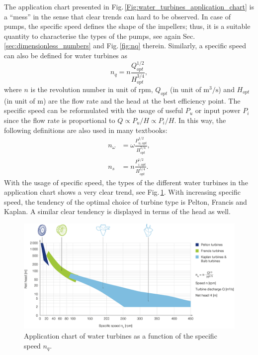 The application chart presented in Fig.\,\ref{Fig:water_turbines_application_chart} is a ``mess'' in the sense that clear trends can hard to be observed. In case of pumps, the specific speed defines the shape of the impellers; thus, it is a suitable quantity to characterise the types of the pumps, see again Sec.\,\ref{sec:dimensionless_numbers} and Fig.\,\ref{fig:nq} therein. Similarly, a specific speed can also be defined for water turbines as
%
\begin{equation}
n_q = n \frac{Q_{opt}^{1/2}}{H_{opt}^{3/4}},
\end{equation}
%
where $n$ is the revolution number in unit of $\mathrm{rpm}$, $Q_{opt}$ (in unit of $\mathrm{m^3/s}$) and $H_{opt}$ (in unit of $\mathrm{m}$) are the flow rate and the head at the best efficiency point. The specific speed can be reformulated with the usage of useful $P_u$ or input power $P_i$ since the flow rate is proportional to $Q \propto P_u/H \propto P_i/H$. In this way, the following definitions are also used in many textbooks:
%
\begin{align}
n_{\omega} &= \omega \frac{P_{u,opt}^{1/2}}{H_{opt}^{5/4}}, \\
n_s        &= n \frac{P_{i,opt}^{1/2}}{H_{opt}^{5/4}}.
\end{align}
%
With the usage of specific speed, the types of the different water turbines in the application chart shows a very clear trend, see Fig.\,\ref{Fig:water_turbines_application_chart_specific_speed}. With increasing specific speed, the tendency of the optimal choice of turbine type is Pelton, Francis and Kaplan. A similar clear tendency is displayed in terms of the head as well.

\begin{figure}[ht!]
	\centering
		\includegraphics[width=12cm]{HydroAndWindPower/Figures/Water_Turbine_Chart_Specific_Speed.png}
	\caption{Application chart of water turbines as a function of the specific speed $n_q$.}
	\label{Fig:water_turbines_application_chart_specific_speed}
\end{figure}

